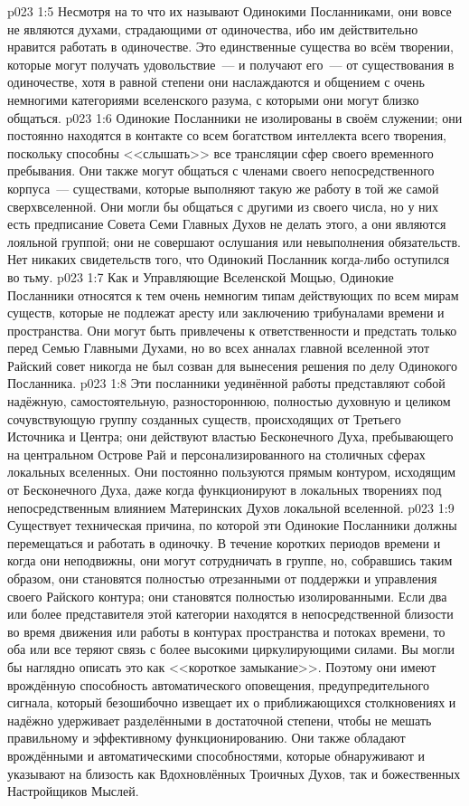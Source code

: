 \vs p023 1:5 Несмотря на то что их называют Одинокими Посланниками, они вовсе не являются духами, страдающими от одиночества, ибо им действительно нравится работать в одиночестве. Это единственные существа во всём творении, которые могут получать удовольствие~--- и получают его~--- от существования в одиночестве, хотя в равной степени они наслаждаются и общением с очень немногими категориями вселенского разума, с которыми они могут близко общаться.
\vs p023 1:6 \pc Одинокие Посланники не изолированы в своём служении; они постоянно находятся в контакте со всем богатством интеллекта всего творения, поскольку способны <<слышать>> все трансляции сфер своего временного пребывания. Они также могут общаться с членами своего непосредственного корпуса~--- существами, которые выполняют такую же работу в той же самой сверхвселенной. Они могли бы общаться с другими из своего числа, но у них есть предписание Совета Семи Главных Духов не делать этого, а они являются лояльной группой; они не совершают ослушания или невыполнения обязательств. Нет никаких свидетельств того, что Одинокий Посланник когда\hyp{}либо оступился во тьму.
\vs p023 1:7 Как и Управляющие Вселенской Мощью, Одинокие Посланники относятся к тем очень немногим типам действующих по всем мирам существ, которые не подлежат аресту или заключению трибуналами времени и пространства. Они могут быть привлечены к ответственности и предстать только перед Семью Главными Духами, но во всех анналах главной вселенной этот Райский совет никогда не был созван для вынесения решения по делу Одинокого Посланника.
\vs p023 1:8 Эти посланники уединённой работы представляют собой надёжную, самостоятельную, разностороннюю, полностью духовную и целиком сочувствующую группу созданных существ, происходящих от Третьего Источника и Центра; они действуют властью Бесконечного Духа, пребывающего на центральном Острове Рай и персонализированного на столичных сферах локальных вселенных. Они постоянно пользуются прямым контуром, исходящим от Бесконечного Духа, даже когда функционируют в локальных творениях под непосредственным влиянием Материнских Духов локальной вселенной.
\vs p023 1:9 \pc Существует техническая причина, по которой эти Одинокие Посланники должны перемещаться и работать в одиночку. В течение коротких периодов времени и когда они неподвижны, они могут сотрудничать в группе, но, собравшись таким образом, они становятся полностью отрезанными от поддержки и управления своего Райского контура; они становятся полностью изолированными. Если два или более представителя этой категории находятся в непосредственной близости во время движения или работы в контурах пространства и потоках времени, то оба или все теряют связь с более высокими циркулирующими силами. Вы могли бы наглядно описать это как <<короткое замыкание>>. Поэтому они имеют врождённую способность автоматического оповещения, предупредительного сигнала, который безошибочно извещает их о приближающихся столкновениях и надёжно удерживает разделёнными в достаточной степени, чтобы не мешать правильному и эффективному функционированию. Они также обладают врождёнными и автоматическими способностями, которые обнаруживают и указывают на близость как Вдохновлённых Троичных Духов, так и божественных Настройщиков Мыслей.
